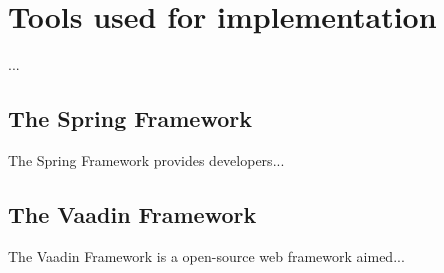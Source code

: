\chapter{Tools used for implementation}\label{c:tools}

...

\section{The Spring Framework}
The Spring Framework \cite{Spring:2017} provides developers...

\section{The Vaadin Framework}
The Vaadin Framework \cite{Senn:2009} is a open-source web framework aimed...
